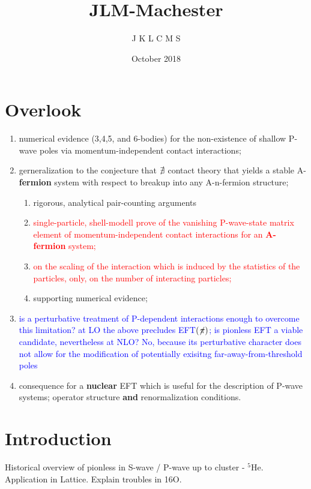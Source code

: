 \documentclass[onecolumn,preprint,nosuperscriptaddress,nofootinbib,12pt,linenumbers]{revtex4-1}
\newcommand{\red}[1]{\textcolor{red}{#1}}
\newcommand{\blue}[1]{\textcolor{blue}{#1}}
\newcommand{\eftnopi}{\mbox{EFT$(\not \! \pi)$}}
\begin{document}
\title{JLM-Machester}
\author{J K L C M S}
\date{October 2018}


\maketitle


\section{Overlook}
\begin{enumerate}
    \item numerical evidence (3,4,5, and 6-bodies) for the non-existence of shallow P-wave poles via momentum-independent contact interactions;
    \item gerneralization to the conjecture that $\slashed{\exists}$ contact theory that yields a stable
    A-{\bf fermion} system with respect to breakup into any A-n-fermion structure;
    \begin{enumerate}
        \item rigorous, analytical pair-counting arguments
        \item \red{single-particle, shell-modell prove of the vanishing P-wave-state matrix element of momentum-independent
        contact interactions for an {\bf A-fermion} system;}
        \item \red{on the scaling of the interaction which is induced by the statistics of the particles, only, on the
        number of interacting particles;} 
        \item supporting numerical evidence;
    \end{enumerate}
    \item \blue{is a perturbative treatment of P-dependent interactions enough to overcome this limitation?
     at LO the above precludes \eftnopi; is pionless EFT a viable candidate, nevertheless at NLO?
        No, because its perturbative character does not allow for the modification of potentially exisitng far-away-from-threshold poles}
    \item consequence for a {\bf nuclear} EFT which is useful for the description of P-wave systems;
    operator structure {\bf and} renormalization conditions.
\end{enumerate}


\section{Introduction}
Historical overview of pionless in S-wave / P-wave up to cluster - $^5$He.
Application in Lattice.
Explain troubles in 16O.
\end{document}
